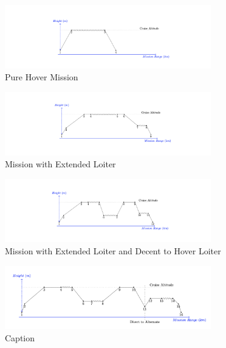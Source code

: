 \begin{figure}[H]
    \centering
    \includegraphics[width=0.8\textwidth]{misison5.png}
    \caption{Pure Hover Mission}
    \label{fig:my_label}
\end{figure}

\begin{figure}[H]
    \centering
    \includegraphics[width=0.8\textwidth]{PrelimSizing/mission1.png}
    \caption{Mission with Extended Loiter}
    \label{fig:my_label}
\end{figure}


\begin{figure}[H]
    \centering
    \includegraphics[width=0.8\textwidth]{mission4.png}
    \caption{Mission with Extended Loiter and Decent to Hover Loiter}
    \label{fig:my_label}
\end{figure}

\begin{figure}[H]
    \centering
    \includegraphics[width=0.8\textwidth]{PrelimSizing/mission3.png}
    \caption{Caption}
    \label{fig:my_label}
\end{figure}

